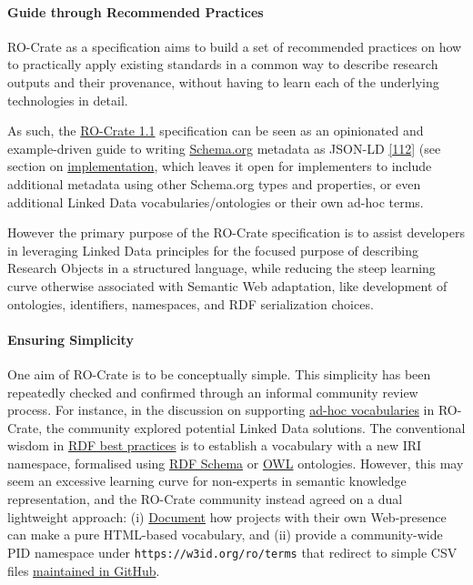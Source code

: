 {\hypertarget{recommendedpractices}{%
\paragraph{Guide through Recommended
Practices}\label{recommendedpractices}}

RO-Crate as a specification aims to build a set of recommended practices
on how to practically apply existing standards in a common way to
describe research outputs and their provenance, without having to learn
each of the underlying technologies in detail.

As such, the \href{https://w3id.org/ro/crate/1.1}{RO-Crate 1.1}
specification \cite{ch5-106}
can be seen as an opinionated and example-driven guide to writing
\href{https://schema.org/}{Schema.org}
\cite{ch5-62} metadata as
JSON-LD
\href{https://www.w3.org/TR/2014/REC-json-ld-20140116/}{{[}112{]}} (see
section on \protect\hyperlink{implementation}{implementation}, which
leaves it open for implementers to include additional metadata using
other Schema.org types and properties, or even additional Linked Data
vocabularies/ontologies or their own ad-hoc terms.

However the primary purpose of the RO-Crate specification is to assist
developers in leveraging Linked Data principles for the focused purpose
of describing Research Objects in a structured language, while reducing
the steep learning curve otherwise associated with Semantic Web
adaptation, like development of ontologies, identifiers, namespaces, and
RDF serialization choices.

\hypertarget{simplicity}{%
\paragraph{Ensuring Simplicity}\label{simplicity}}

One aim of RO-Crate is to be conceptually simple. This simplicity has
been repeatedly checked and confirmed through an informal community
review process. For instance, in the discussion on supporting
\href{https://github.com/ResearchObject/ro-crate/issues/71}{ad-hoc
vocabularies} in RO-Crate, the community explored potential Linked Data
solutions. The conventional wisdom in
\href{https://www.w3.org/TR/swbp-vocab-pub/}{RDF best practices} is to
establish a vocabulary with a new IRI namespace, formalised using
\href{http://www.w3.org/TR/2014/REC-rdf-schema-20140225/}{RDF Schema} or
\href{http://www.w3.org/TR/2012/REC-owl2-overview-20121211/}{OWL}
ontologies. However, this may seem an excessive learning curve for
non-experts in semantic knowledge representation, and the RO-Crate
community instead agreed on a dual lightweight approach: (i)
\href{https://www.researchobject.org/ro-crate/1.1/appendix/jsonld.html\#adding-new-or-ad-hoc-vocabulary-terms}{Document}
how projects with their own Web-presence can make a pure HTML-based
vocabulary, and (ii) provide a community-wide PID namespace under
\texttt{https://w3id.org/ro/terms} that redirect to simple CSV files
\href{https://github.com/ResearchObject/ro-terms}{maintained in GitHub}.

}
